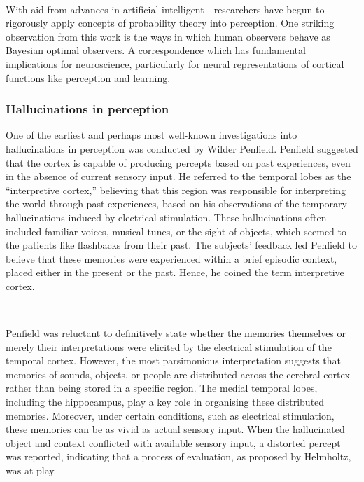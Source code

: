 \documentclass{article}
\begin{document}

\

With aid from advances in artificial intelligent - researchers have begun to rigorously apply concepts of probability theory into perception. \citep{knill2004bayesian} One striking observation from this work is the ways in which human observers behave as Bayesian optimal observers. A correspondence which has fundamental implications for neuroscience, particularly for neural representations of cortical functions like perception and learning. \citep{trommershauser2003statisticalb, trommershauser2003statisticala}

\subsubsection{Hallucinations in perception}

One of the earliest and perhaps most well-known investigations into hallucinations in perception was conducted by Wilder Penfield. \citep{penfield1961activation} Penfield suggested that the cortex is capable of producing percepts based on past experiences, even in the absence of current sensory input. He referred to the temporal lobes as the ``interpretive cortex,'' believing that this region was responsible for interpreting the world through past experiences, based on his observations of the temporary hallucinations induced by electrical stimulation. These hallucinations often included familiar voices, musical tunes, or the sight of objects, which seemed to the patients like flashbacks from their past. The subjects' feedback led Penfield to believe that these memories were experienced within a brief episodic context, placed either in the present or the past. Hence, he coined the term interpretive cortex. \citep{knill2004bayesian}

\

Penfield was reluctant to definitively state whether the memories themselves or merely their interpretations were elicited by the electrical stimulation of the temporal cortex. However, the most parsimonious interpretation suggests that memories of sounds, objects, or people are distributed across the cerebral cortex rather than being stored in a specific region. The medial temporal lobes, including the hippocampus, play a key role in organising these distributed memories. \citep{aggelopoulos2015perceptual} Moreover, under certain conditions, such as electrical stimulation, these memories can be as vivid as actual sensory input. When the hallucinated object and context conflicted with available sensory input, a distorted percept was reported, indicating that a process of evaluation, as proposed by Helmholtz, was at play.
\end{document}
